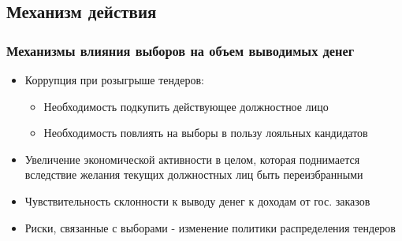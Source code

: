 \subsection{Механизм действия}

\begin{frame}
\frametitle{Механизмы влияния выборов на объем выводимых денег}
\begin{itemize}
	
\item Коррупция при розыгрыше тендеров:
	\begin{itemize}
	\item Необходимость подкупить действующее должностное лицо
	\item Необходимость повлиять на выборы в пользу лояльных кандидатов
	\end{itemize}

\item Увеличение экономической активности в целом, которая поднимается вследствие желания текущих должностных лиц быть переизбранными

\item Чувствительность склонности к выводу денег к доходам от гос. заказов

\item Риски, связанные с выборами - изменение политики распределения тендеров
\end{itemize}
\end{frame}
